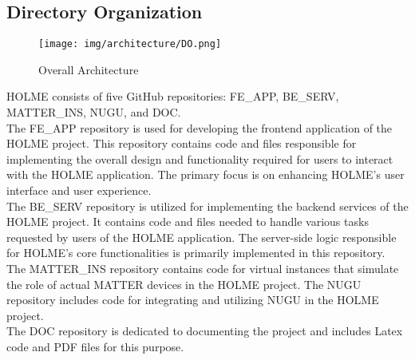 \documentclass[conference]{IEEEtran}
\begin{document}
\subsection{Directory Organization}
\begin{figure}[h]
\centering   
\texttt{[image: img/architecture/DO.png]}
\caption{Overall Architecture}
\end{figure}

HOLME consists of five GitHub repositories: FE\_APP, BE\_SERV, MATTER\_INS, NUGU, and DOC.\\
The FE\_APP repository is used for developing the frontend application of the HOLME project. This repository contains code and files responsible for implementing the overall design and functionality required for users to interact with the HOLME application. The primary focus is on enhancing HOLME's user interface and user experience.\\
The BE\_SERV repository is utilized for implementing the backend services of the HOLME project. It contains code and files needed to handle various tasks requested by users of the HOLME application. The server-side logic responsible for HOLME's core functionalities is primarily implemented in this repository.\\
The MATTER\_INS repository contains code for virtual instances that simulate the role of actual MATTER devices in the HOLME project.
The NUGU repository includes code for integrating and utilizing NUGU in the HOLME project.\\
The DOC repository is dedicated to documenting the project and includes Latex code and PDF files for this purpose.
\end{document}

